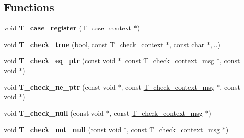 \subsection*{Functions}
\begin{DoxyCompactItemize}
\item 
\mbox{\label{group__RTEMSTestFrameworkImpl_ga4116bd2e85404d088eef9cb0f568515e}} 
void {\bfseries T\+\_\+case\+\_\+register} (\mbox{\hyperlink{structT__case__context}{T\+\_\+case\+\_\+context}} $\ast$)
\item 
\mbox{\label{group__RTEMSTestFrameworkImpl_ga06702d3f81470cb8ca4e202ddd3f8366}} 
void {\bfseries T\+\_\+check\+\_\+true} (bool, const \mbox{\hyperlink{structT__check__context}{T\+\_\+check\+\_\+context}} $\ast$, const char $\ast$,...)
\item 
\mbox{\label{group__RTEMSTestFrameworkImpl_ga6655dcdac461f459e39c8a7d226314eb}} 
void {\bfseries T\+\_\+check\+\_\+eq\+\_\+ptr} (const void $\ast$, const \mbox{\hyperlink{structT__check__context__msg}{T\+\_\+check\+\_\+context\+\_\+msg}} $\ast$, const void $\ast$)
\item 
\mbox{\label{group__RTEMSTestFrameworkImpl_ga07fa4713b2891307ef8a5017b97ec3b8}} 
void {\bfseries T\+\_\+check\+\_\+ne\+\_\+ptr} (const void $\ast$, const \mbox{\hyperlink{structT__check__context__msg}{T\+\_\+check\+\_\+context\+\_\+msg}} $\ast$, const void $\ast$)
\item 
\mbox{\label{group__RTEMSTestFrameworkImpl_gaee148030715a07628d4f196c0222a8da}} 
void {\bfseries T\+\_\+check\+\_\+null} (const void $\ast$, const \mbox{\hyperlink{structT__check__context__msg}{T\+\_\+check\+\_\+context\+\_\+msg}} $\ast$)
\item 
\mbox{\label{group__RTEMSTestFrameworkImpl_ga6a777cda7bd0b15af008ac7d9bed021e}} 
void {\bfseries T\+\_\+check\+\_\+not\+\_\+null} (const void $\ast$, const \mbox{\hyperlink{structT__check__context__msg}{T\+\_\+check\+\_\+context\+\_\+msg}} $\ast$)
\item 
\mbox{\label{group__RTEMSTestFrameworkImpl_gaea9d57248f9bf727e94f05c4088a167a}} 

\end{DoxyCompactItemize}
